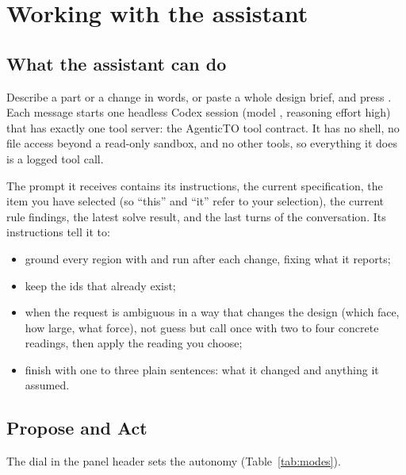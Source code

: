 \chapter{Working with the assistant}\label{ch:assistant}

\section{What the assistant can do}
Describe a part or a change in words, or paste a whole design brief, and press . Each message starts one
headless Codex session (model , reasoning effort high) that has exactly one tool server: the AgenticTO
tool contract. It has no shell, no file access beyond a read-only sandbox, and no other tools, so everything it does is
a logged tool call.

The prompt it receives contains its instructions, the current specification, the item you have selected (so ``this''
and ``it'' refer to your selection), the current rule findings, the latest solve result, and the last turns of the
conversation. Its instructions tell it to:
\begin{itemize}
  \item ground every region with  and run  after each change, fixing what it
  reports;
  \item keep the ids that already exist;
  \item when the request is ambiguous in a way that changes the design (which face, how large, what force), not guess but
  call  once with two to four concrete readings, then apply the reading you choose;
  \item finish with one to three plain sentences: what it changed and anything it assumed.
\end{itemize}

\section{Propose and Act}\label{sec:modes}
The dial in the panel header sets the autonomy (Table~\ref{tab:modes}).


